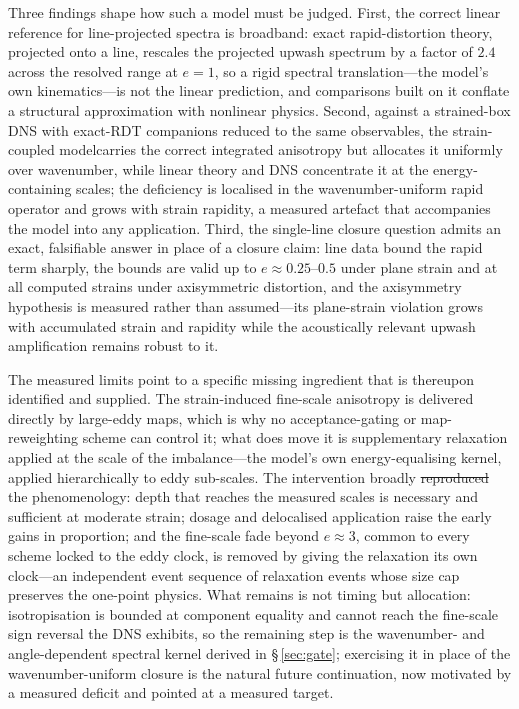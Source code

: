 \documentclass[lineno]{JFM-FLM_Au}
\providecommand{\DIFadd}[1]{{\protect\color{blue}\uwave{#1}}} %
\providecommand{\DIFdel}[1]{{\protect\color{red}\sout{#1}}} %
\providecommand{\DIFaddbegin}{} %
\providecommand{\DIFaddend}{} %
\providecommand{\DIFdelbegin}{} %
\providecommand{\DIFdelend}{} %
\begin{document}
Three findings shape how such a model must be judged. First, the
correct linear reference for line-projected spectra is broadband: exact
rapid-distortion theory, projected onto a line, rescales the
projected upwash spectrum by a factor of $2.4$ across the resolved range
at $e=1$, so a rigid spectral translation---the model's own
kinematics---is not the linear prediction, and comparisons built on it
conflate a structural approximation with nonlinear physics. Second,
against a strained-box DNS with exact-RDT companions reduced to the
same observables, the \DIFaddbegin \DIFadd{preliminary }\DIFaddend strain-coupled model\DIFaddbegin \DIFadd{, SC-ODT, }\DIFaddend carries
the correct integrated anisotropy but allocates it uniformly over wavenumber, while
linear theory and DNS concentrate it at the energy-containing scales;
the deficiency is localised in the wavenumber-uniform rapid operator
and grows with strain rapidity, a measured artefact that
accompanies the model into any application. Third, the single-line
closure question admits an exact, falsifiable answer in place of a
closure claim: line data bound the rapid term sharply, the bounds are
valid up to $e\approx0.25$--$0.5$ under plane strain and at all
computed strains under axisymmetric distortion, and the axisymmetry
hypothesis is measured rather than assumed---its plane-strain violation
grows with accumulated strain and rapidity while the acoustically
relevant upwash amplification remains robust to it.

The measured limits point to a specific missing ingredient that is thereupon identified and supplied. The strain-induced fine-scale
anisotropy is delivered directly by large-eddy maps, which is why no
acceptance-gating or map-reweighting scheme can control it; what does
move it is supplementary relaxation applied at the scale of the imbalance---the
model's own energy-equalising kernel, applied hierarchically to eddy
sub-scales. The intervention broadly \DIFdelbegin \DIFdel{reproduced }\DIFdelend \DIFaddbegin \DIFadd{reproduces }\DIFaddend the phenomenology: depth that reaches the measured scales is necessary and
sufficient at moderate strain; dosage and delocalised application
raise the early gains in proportion; and the fine-scale fade beyond
$e\approx3$, common to every scheme locked to the eddy clock, is
removed by giving the relaxation its own clock---an independent event sequence
of relaxation events whose size cap preserves the one-point
physics. What remains is not timing but allocation: isotropisation is
bounded at component equality and cannot reach the fine-scale sign
reversal the DNS exhibits, so the remaining step is the
wavenumber- and angle-dependent spectral kernel derived in
\S\,\ref{sec:gate}; exercising it in place of the wavenumber-uniform
closure is the natural future continuation, now motivated by a measured
deficit and pointed at a measured target.
\end{document}
